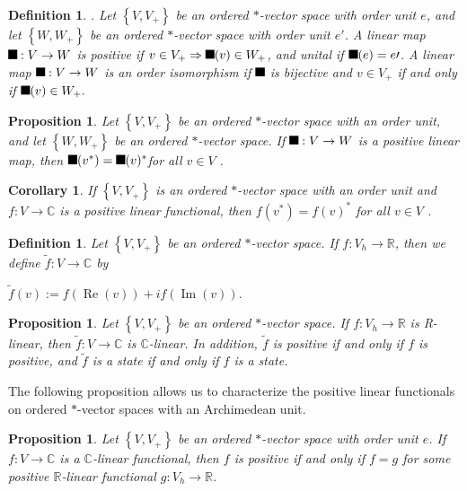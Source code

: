 \documentclass[aps,preprint]{revtex4}%
\providecommand{\U}[1]{\protect\rule{.1in}{.1in}}
\newtheorem{corollary}[theorem]{Corollary}
\newtheorem{definition}[theorem]{Definition}
\newtheorem{proposition}[theorem]{Proposition}
\begin{document}
\begin{definition}
. Let $\left\{  V,V_{+}\right\}  $ be an ordered $\ast$-vector space with
order unit $e$, and let $\left\{  W,W_{+}\right\}  $ be an ordered $\ast
$-vector space with order unit $e\prime$. A linear map $\U{3c6} :V\rightarrow
W$ is positive if $v\in V_{+}\Rightarrow\U{3c6} (v)\in W_{+}$, and unital if
$\U{3c6} (e)=e\prime$. A linear map $\U{3c6} :V\rightarrow W$ is an order
isomorphism if $\U{3c6} $ is bijective and $v\in V_{+}$ if and only if
$\U{3c6} (v)\in W_{+}.$
\end{definition}

\begin{proposition}
Let $\left\{  V,V_{+}\right\}  $ be an ordered $\ast$-vector space with an
order unit, and let $\left\{  W,W_{+}\right\}  $ be an ordered $\ast$-vector
space. If $\U{3c6} :V\rightarrow W$ is a positive linear map, then $\U{3c6}
(v^{\ast})=\U{3c6} (v)^{\ast}$for all $v\in V$ .
\end{proposition}

\begin{corollary}
If $\left\{  V,V_{+}\right\}  $ is an ordered $\ast$-vector space with an
order unit and $f:V\rightarrow\mathbb{C}$ is a positive linear functional,
then $f(v^{\ast})=f(v)^{\ast}$ for all $v\in V$ .
\end{corollary}

\begin{definition}
Let $\left\{  V,V_{+}\right\}  $ be an ordered $\ast$-vector space. If
$f:V_{h}\rightarrow\mathbb{R}$, then we define $\widetilde{f}:V\rightarrow
\mathbb{C}$ by
\end{definition}

$\widetilde{f}(v):=f(\operatorname{Re}(v))+if(\operatorname{Im}(v))$.

\begin{proposition}
Let $\left\{  V,V_{+}\right\}  $ be an ordered $\ast$-vector space. If
$f:V_{h}\rightarrow\mathbb{R}$ is R-linear, then $\widetilde{f}:V\rightarrow
\mathbb{C}$ is $\mathbb{C}$-linear. In addition, $\widetilde{f}$ is positive
if and only if $f$ is positive, and $\widetilde{f}$ is a state if and only if
$f$ is a state.
\end{proposition}

The following proposition allows us to characterize the positive linear
functionals on ordered $\ast$-vector spaces with an Archimedean unit.

\begin{proposition}
Let $\left\{  V,V_{+}\right\}  $ be an ordered $\ast$-vector space with order
unit $e$. If $f:V\rightarrow\mathbb{C}$ is a $\mathbb{C}$-linear functional,
then $f$ is positive if and only if $f=g$ for some positive $\mathbb{R}%
$-linear functional $g:V_{h}\rightarrow\mathbb{R}$. 
\end{proposition}
\end{document}
